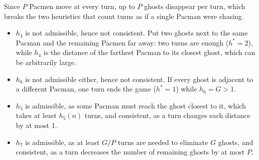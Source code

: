 \documentclass[11pt, a4paper]{exam}
\begin{document}
\begin{exercises}[1, 3 (a)--(c), 5]
\begin{parts}
    \begin{solution}
        Since $P$ Pacmen move at every turn, up to $P$ ghosts disappear per turn, which breaks the two heuristics that count turns as if a single Pacman were chasing.
        \begin{itemize}
            \item $h_4$ is not admissible, hence not consistent. Put two ghosts next to the same Pacman and the remaining Pacmen far away: two turns are enough ($h^* = 2$), while $h_4$ is the distance of the farthest Pacman to its closest ghost, which can be arbitrarily large.
            \item $h_6$ is not admissible either, hence not consistent. If every ghost is adjacent to a different Pacman, one turn ends the game ($h^* = 1$) while $h_6 = G > 1$.
            \item $h_5$ is admissible, as some Pacman must reach the ghost closest to it, which takes at least $h_5(n)$ turns, and consistent, as a turn changes each distance by at most 1.
            \item $h_7$ is admissible, as at least $G / P$ turns are needed to eliminate $G$ ghosts, and consistent, as a turn decreases the number of remaining ghosts by at most $P$.
        \end{itemize}
    \end{solution}
\end{parts}

\end{exercises}
\end{document}

